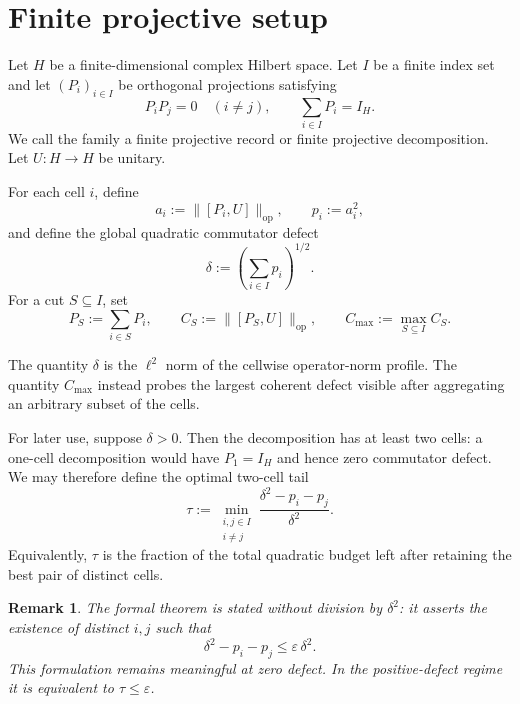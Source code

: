 \documentclass[11pt]{article}
\newtheorem{remark}[theorem]{Remark}
\newcommand{\op}{\mathrm{op}}
\newcommand{\cmax}{C_{\max}}
\newcommand{\dd}{\delta}
\newcommand{\tauq}{\tau}
\begin{document}
\section{Finite projective setup}

Let $H$ be a finite-dimensional complex Hilbert space.  Let
$I$ be a finite index set and let $(P_i)_{i\in I}$ be orthogonal projections
satisfying
\begin{equation}\label{eq:decomp}
  P_iP_j=0\quad(i\neq j),
  \qquad
  \sum_{i\in I}P_i=I_H.
\end{equation}
We call the family a finite projective record or finite projective
decomposition.  Let $U:H\to H$ be unitary.

For each cell $i$, define
\begin{equation}\label{eq:ai}
  a_i:=\|[P_i,U]\|_{\op},
  \qquad
  p_i:=a_i^2,
\end{equation}
and define the global quadratic commutator defect
\begin{equation}\label{eq:delta}
  \dd:=\left(\sum_{i\in I}p_i\right)^{1/2}.
\end{equation}
For a cut $S\subseteq I$, set
\begin{equation}\label{eq:cut}
  P_S:=\sum_{i\in S}P_i,
  \qquad
  C_S:=\|[P_S,U]\|_{\op},
  \qquad
  \cmax:=\max_{S\subseteq I}C_S.
\end{equation}

The quantity $\dd$ is the $\ell^2$ norm of the cellwise operator-norm profile.
The quantity $\cmax$ instead probes the largest coherent defect visible after
aggregating an arbitrary subset of the cells.

For later use, suppose $\dd>0$.  Then the decomposition has at least two
cells: a one-cell decomposition would have $P_1=I_H$ and hence zero
commutator defect.  We may therefore define the optimal two-cell tail
\begin{equation}\label{eq:tau}
  \tauq:=
  \min_{\substack{i,j\in I\\i\neq j}}
  \frac{\dd^2-p_i-p_j}{\dd^2}.
\end{equation}
Equivalently, $\tauq$ is the fraction of the total quadratic budget left after
retaining the best pair of distinct cells.

\begin{remark}
The formal theorem is stated without division by $\dd^2$: it asserts the
existence of distinct $i,j$ such that
\[
  \dd^2-p_i-p_j\le \varepsilon\,\dd^2.
\]
This formulation remains meaningful at zero defect.  In the positive-defect
regime it is equivalent to $\tauq\le\varepsilon$.
\end{remark}
\end{document}

